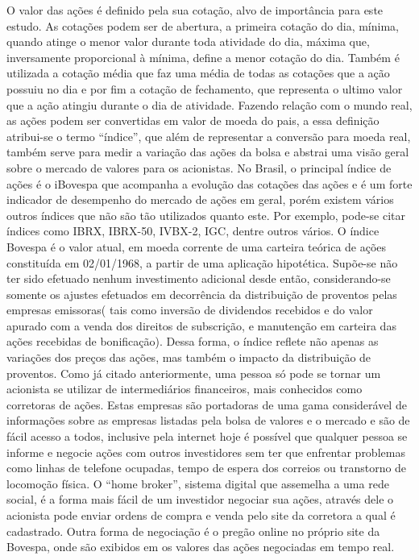 \documentclass[brazil,twocolumn]{svjour3}
\begin{document}
O valor das ações é definido pela sua cotação, alvo de importância para este estudo. As cotações podem ser de abertura, a primeira cotação do dia, mínima, quando atinge o menor valor durante toda atividade do dia, máxima que, inversamente proporcional à mínima, define a menor cotação do dia. Também é utilizada a cotação média que faz uma média de todas as cotações que a ação possuiu no dia e por fim a cotação de fechamento, que representa o ultimo valor que a ação atingiu durante o dia de atividade.
Fazendo relação com o mundo real, as ações podem ser convertidas em valor de moeda do pais, a essa definição atribui-se o termo “índice”, que além de representar a conversão para moeda real, também serve para medir a variação das
ações da bolsa e abstrai uma visão geral sobre o mercado de valores para os acionistas. No Brasil, o principal índice de ações é o iBovespa que acompanha a evolução das cotações das ações e é um forte indicador de desempenho do mercado de ações em geral, porém existem vários outros índices que não são tão utilizados quanto este. Por exemplo, pode-se citar índices como IBRX, IBRX-50, IVBX-2, IGC, dentre outros vários.
O índice Bovespa é o valor atual, em moeda corrente de uma carteira teórica de ações constituída em 02/01/1968, a partir de uma aplicação hipotética. Supõe-se não ter sido efetuado nenhum investimento adicional desde então, considerando-se somente os ajustes efetuados em decorrência da distribuição de proventos pelas empresas emissoras( tais como inversão de dividendos recebidos e do valor apurado com a venda dos direitos de subscrição, e manutenção em carteira das ações recebidas de bonificação). Dessa forma, o índice reflete não apenas as variações dos preços das ações, mas também o impacto da distribuição de proventos.
Como já citado anteriormente, uma pessoa só pode se tornar um acionista se utilizar de intermediários financeiros, mais conhecidos como corretoras de ações. Estas empresas são portadoras de uma gama considerável de informações sobre as empresas listadas pela bolsa de valores e o mercado e são de fácil acesso a todos, inclusive pela internet hoje é possível que qualquer pessoa se informe e negocie ações com outros investidores sem ter que enfrentar problemas como linhas de telefone ocupadas, tempo de espera dos correios ou transtorno de locomoção física. O “home broker”, sistema digital que assemelha a uma rede social, é a forma mais fácil de um investidor negociar sua ações, através dele o acionista pode enviar ordens de compra e venda pelo site da corretora a qual é cadastrado. Outra forma de negociação é o pregão online no próprio site da Bovespa, onde são exibidos em os valores das ações negociadas em tempo real.
\end{document}
